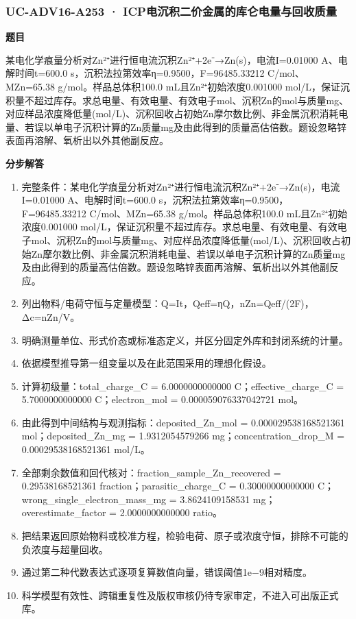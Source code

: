 \documentclass[UTF8,11pt,a4paper]{ctexart}
\begin{document}
\subsubsection*{UC-ADV16-A253 · ICP电沉积二价金属的库仑电量与回收质量}
\noindent\textbf{题目}\par
某电化学痕量分析对Zn²⁺进行恒电流沉积Zn²⁺+2e⁻→Zn(s)，电流I=0.01000 A、电解时间t=600.0 s，沉积法拉第效率η=0.9500，F=96485.33212 C/mol、MZn=65.38 g/mol。样品总体积100.0 mL且Zn²⁺初始浓度0.001000 mol/L，保证沉积量不超过库存。求总电量、有效电量、有效电子mol、沉积Zn的mol与质量mg、对应样品浓度降低量(mol/L)、沉积回收占初始Zn摩尔数比例、非金属沉积消耗电量、若误以单电子沉积计算的Zn质量mg及由此得到的质量高估倍数。题设忽略锌表面再溶解、氧析出以外其他副反应。\par
\medskip\noindent\textbf{分步解答}
\begin{enumerate}
\item 完整条件：某电化学痕量分析对Zn²⁺进行恒电流沉积Zn²⁺+2e⁻→Zn(s)，电流I=0.01000 A、电解时间t=600.0 s，沉积法拉第效率η=0.9500，F=96485.33212 C/mol、MZn=65.38 g/mol。样品总体积100.0 mL且Zn²⁺初始浓度0.001000 mol/L，保证沉积量不超过库存。求总电量、有效电量、有效电子mol、沉积Zn的mol与质量mg、对应样品浓度降低量(mol/L)、沉积回收占初始Zn摩尔数比例、非金属沉积消耗电量、若误以单电子沉积计算的Zn质量mg及由此得到的质量高估倍数。题设忽略锌表面再溶解、氧析出以外其他副反应。
\item 列出物料/电荷守恒与定量模型：Q=It，Qeff=ηQ，nZn=Qeff/(2F)，Δc=nZn/V。
\item 明确测量单位、形式价态或标准态定义，并区分固定外库和封闭系统的计量。
\item 依据模型推导第一组变量以及在此范围采用的理想化假设。
\item 计算初级量：total\_charge\_C = 6.0000000000000 C；effective\_charge\_C = 5.7000000000000 C；electron\_mol = 0.000059076337042721 mol。
\item 由此得到中间结构与观测指标：deposited\_Zn\_mol = 0.000029538168521361 mol；deposited\_Zn\_mg = 1.9312054579266 mg；concentration\_drop\_M = 0.00029538168521361 mol/L。
\item 全部剩余数值和回代核对：fraction\_sample\_Zn\_recovered = 0.29538168521361 fraction；parasitic\_charge\_C = 0.30000000000000 C；wrong\_single\_electron\_mass\_mg = 3.8624109158531 mg；overestimate\_factor = 2.0000000000000 ratio。
\item 把结果返回原始物料或校准方程，检验电荷、原子或浓度守恒，排除不可能的负浓度与超量回收。
\item 通过第二种代数表达式逐项复算数值向量，错误阈值1e−9相对精度。
\item 科学模型有效性、跨辑重复性及版权审核仍待专家审定，不进入可出版正式库。
\end{enumerate}
\end{document}
